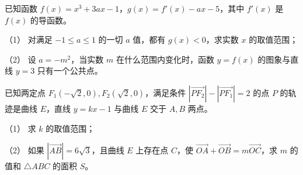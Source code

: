 \begin{question}
已知函数 $f(x)=x^3+3ax-1$，$g(x)=f'(x)-ax-5$，其中 $f'(x)$ 是 $f(x)$ 的导函数。

（1） 对满足 $-1\leqslant a\leqslant1$ 的一切 $a$ 值，都有 $g(x)<0$，求实数 $x$ 的取值范围；

（2） 设 $a=-m^2$，当实数 $m$ 在什么范围内变化时，函数 $y=f(x)$ 的图象与直线 $y=3$ 只有一个公共点。

\end{question}
\begin{question}
已知两定点 $F_1(-\sqrt2,0),F_2(\sqrt2,0)$，满足条件 $\left|\overrightarrow{PF_2}\right|-\left|\overrightarrow{PF_1}\right|=2$ 的点 $P$ 的轨迹是曲线 $E$，直线 $y=kx-1$ 与曲线 $E$ 交于 $A,B$ 两点。

（1） 求 $k$ 的取值范围；

（2） 如果 $|\overrightarrow{AB}|=6\sqrt3$，且曲线 $E$ 上存在点 $C$，使 $\overrightarrow{OA}+\overrightarrow{OB}=m\overrightarrow{OC}$，求 $m$ 的值和 $\triangle ABC$ 的面积 $S$。

\end{question}